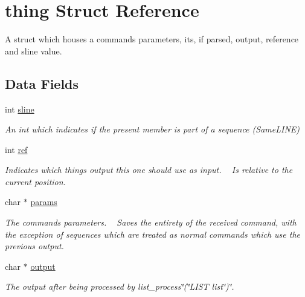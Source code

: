 \hypertarget{structthing}{}\section{thing Struct Reference}
\label{structthing}


A struct which houses a command\textquotesingle{}s parameters, it\textquotesingle{}s, if parsed, output, reference and sline value.  


\subsection*{Data Fields}
\begin{DoxyCompactItemize}
\item 
int \hyperlink{structthing_a8260a04cd33e11250d7680ccd06af2fc}{sline}
\begin{DoxyCompactList}\small\item\em An int which indicates if the present member is part of a sequence (Same\+L\+I\+NE) \end{DoxyCompactList}\item 
int \hyperlink{structthing_adb528a1cb1ca190150183394d082590d}{ref}
\begin{DoxyCompactList}\small\item\em Indicates which thing\textquotesingle{}s output this one should use as input.  ~\newline
 Is relative to the current position. \end{DoxyCompactList}\item 
char $\ast$ \hyperlink{structthing_a0d119d211b6770402e90c832e7d03767}{params}
\begin{DoxyCompactList}\small\item\em The command\textquotesingle{}s parameters.  ~\newline
 Saves the entirety of the received command, with the exception of sequences which are treated as normal commands which use the previous\textquotesingle{} output. \end{DoxyCompactList}\item 
char $\ast$ \hyperlink{structthing_a47866494eb84961e021291efbea9b569}{output}
\begin{DoxyCompactList}\small\item\em The output after being processed by list\+\_\+process\char`\"{}(\char`\"{}L\+I\+ST list\char`\"{})\char`\"{}. \end{DoxyCompactList}\end{DoxyCompactItemize}


